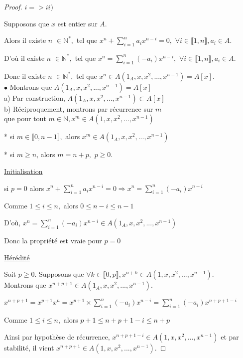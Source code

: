 \begin{proof}
	$i=>ii)$
	
	Supposons que $x$ est entier sur $A.$
	
	Alors il existe $n$ $\in \mathbb{N}^{\ast },$ tel que $x^{n}+\sum\limits_{i=1}^{n}a_{i}x^{n-i}=0,$ $\forall i\in \llbracket 1, n \rrbracket ,a_{i}\in A.$
	
	D'où il existe $n$ $\in \mathbb{N}^{\ast },$ tel que $x^{n}=\sum\limits_{i=1}^{n}(-a_{i})x^{n-i},$ $\forall i\in \llbracket 1, n \rrbracket ,a_{i}\in A.$
	
	Donc il existe $n$ $\in \mathbb{N}^{\ast },$ tel que $x^{n}\in A(1_A,x,x^{2},...,x^{n-1})=A[x].$\\
	$\bullet$ Montrons que $A(1_A,x,x^{2},...,x^{n-1})=A[x]$\\
	a) Par construction, $A(1_A,x,x^{2},...,x^{n-1})\subset A[x]$\\
	b) Réciproquement, montrons par récurrence sur $m$\\ que pour tout $m	\in \mathbb{N},x^{m}\in A(1,x,x^{2},...,x^{n-1})$
	
	* si $m\in \llbracket 0, n-1 \rrbracket ,$ alors $x^{m}\in
	A(1_A,x,x^{2},...,x^{n-1})$
	
	* si $m\geq n$, alors $m=n+p,$ $p\geq 0.$
	
	\underline{Initialisation}
	
	si $p=0$ alors  $x^{n}+\sum\limits_{i=1}^{n}a_{i}x^{n-i}=0\Rightarrow
	x^{n}=\sum\limits_{i=1}^{n}(-a_{i})x^{n-i}$
	
	Comme $1\leq i\leq n,$ alors $0\leq n-i\leq n-1$
	
	D'où, $x^{n}=\sum\limits_{i=1}^{n}(-a_{i})x^{n-i}\in
	A(1_A,x,x^{2},...,x^{n-1})$
	
	Donc la propriété est vraie pour $p=0$
	
	\underline{Hérédité}
	
	Soit $p\geq 0.$ Supposons que $\forall k\in \llbracket 0, p \rrbracket
	,x^{n+k}\in A(1,x,x^{2},...,x^{n-1})$.\\ Montrons que $x^{n+p+1}\in
	A(1_A,x,x^{2},...,x^{n-1}).$
	
	$x^{n+p+1}=x^{p+1}x^{n}=x^{p+1}\times
	\sum\limits_{i=1}^{n}(-a_{i})x^{n-i}=\sum%
	\limits_{i=1}^{n}(-a_{i})x^{n+p+1-i}$
	
	Comme $1\leq i\leq n,$ alors $p+1\leq n+p+1-i\leq n+p$
	
	Ainsi par hypothèse de récurrence, $x^{n+p+1-i}\in
	A(1,x,x^{2},...,x^{n-1})$ et par stabilité, il vient $x^{n+p+1}\in
	A(1,x,x^{2},...,x^{n-1}).$
	

\end{proof}
